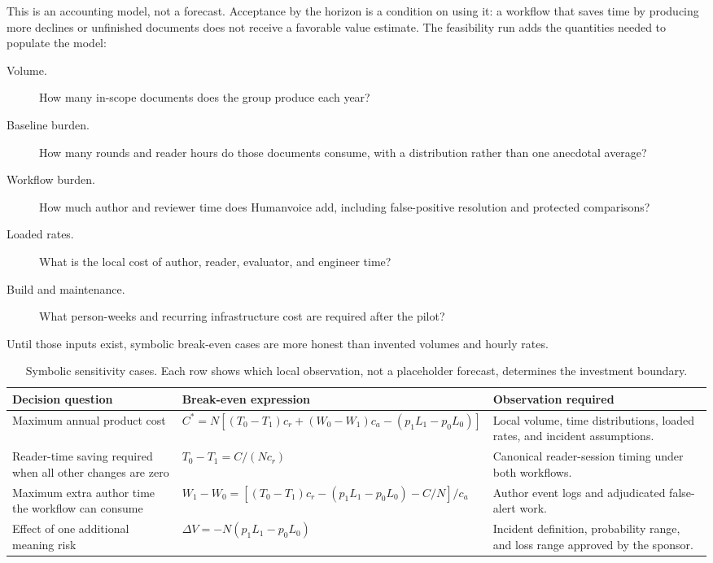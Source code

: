 This is an accounting model, not a forecast. Acceptance by the horizon is a
condition on using it: a workflow that saves time by producing more declines or
unfinished documents does not receive a favorable value estimate. The
feasibility run adds the quantities needed to populate the model:

\begin{description}
\item[Volume.] How many in-scope documents does the group produce each year?
\item[Baseline burden.] How many rounds and reader hours do those documents
  consume, with a distribution rather than one anecdotal average?
\item[Workflow burden.] How much author and reviewer time does Humanvoice add,
  including false-positive resolution and protected comparisons?
\item[Loaded rates.] What is the local cost of author, reader, evaluator, and
  engineer time?
\item[Build and maintenance.] What person-weeks and recurring infrastructure
  cost are required after the pilot?
\end{description}

Until those inputs exist, symbolic break-even cases are more honest than
invented volumes and hourly rates.

\begin{table}[H]
\centering
\small
\begin{tabularx}{\textwidth}{@{}p{}p{}L@{}}
\toprule
Decision question & Break-even expression & Observation required \\
\midrule
Maximum annual product cost &
$C^*=N[(T_0-T_1)c_r+(W_0-W_1)c_a-(p_1L_1-p_0L_0)]$ &
Local volume, time distributions, loaded rates, and incident assumptions. \\
Reader-time saving required when all other changes are zero &
$T_0-T_1=C/(Nc_r)$ & Canonical reader-session timing under both workflows. \\
Maximum extra author time the workflow can consume &
$W_1-W_0=[(T_0-T_1)c_r-(p_1L_1-p_0L_0)-C/N]/c_a$ &
Author event logs and adjudicated false-alert work. \\
Effect of one additional meaning risk &
$\Delta V=-N(p_1L_1-p_0L_0)$ & Incident definition, probability range, and
loss range approved by the sponsor. \\
\bottomrule
\end{tabularx}
\caption{Symbolic sensitivity cases. Each row shows which local observation,
not a placeholder forecast, determines the investment boundary.}
\label{tab:value-sensitivity}
\end{table}


